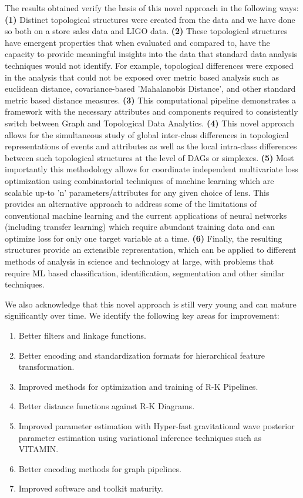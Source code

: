 The results obtained verify the basis of this novel approach in the following ways: \textbf{(1)} Distinct topological structures were created from the data and we have done so both on a store sales data and LIGO data. \textbf{(2)} These topological structures have emergent properties that when evaluated and compared to, have the capacity to provide meaningful insights into the data that standard data analysis techniques would not identify. For example, topological differences were exposed in the analysis that could not be exposed over metric based analysis such as euclidean distance, covariance-based 'Mahalanobis Distance', and other standard metric based distance measures. \textbf{(3)} This computational pipeline demonstrates a framework with the necessary attributes and components required to consistently switch between Graph and Topological Data Analytics.  \textbf{(4)} This novel approach allows for the simultaneous study of global inter-class differences in topological representations of events and attributes as well as the local intra-class differences between such topological structures at the level of DAGs or simplexes. \textbf{(5)} Most importantly this methodology allows for coordinate independent multivariate loss optimization using combinatorial techniques of machine learning which are scalable up-to 'n' parameters/attributes for any given choice of lens. This provides an alternative approach to address some of the limitations of  conventional machine learning and the current applications of neural networks (including transfer learning) which require abundant training data and can optimize loss for only one target variable at a time. \textbf{(6)} Finally, the resulting structures provide an extensible representation, which can be applied to different methods of analysis in science and technology at large, with problems that require ML based classification, identification, segmentation and other similar techniques.

We also acknowledge that this novel approach is still very young and can mature significantly over time. We identify the following key areas for improvement:

\begin{enumerate}
    \item{Better filters and linkage functions.}
    \item{Better encoding and standardization formats for hierarchical feature transformation.}
    \item{Improved methods for optimization and training of R-K Pipelines.}
    \item{Better distance functions against R-K Diagrams.}
    \item{Improved parameter estimation with Hyper-fast gravitational wave posterior parameter estimation using variational inference techniques such as VITAMIN.} \cite{25.6_Glasgow2019VITAMIN}
    \item{Better encoding methods for graph pipelines.}
    \item{Improved software and toolkit maturity.}
\end{enumerate}

